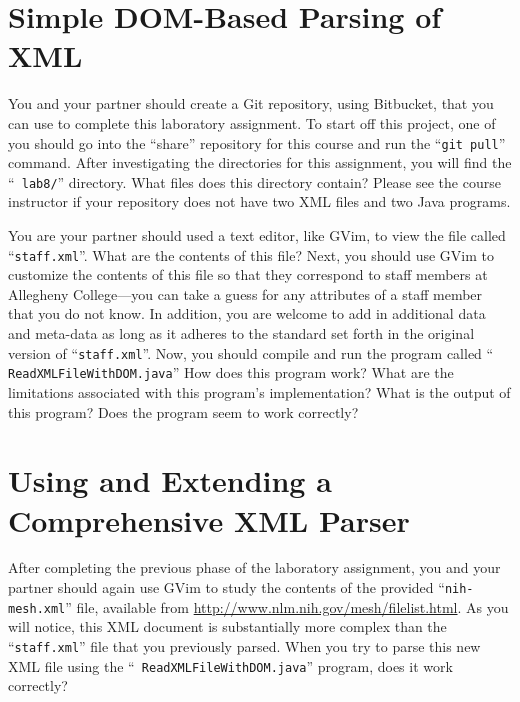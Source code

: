 \section*{Simple DOM-Based Parsing of XML}

You and your partner should create a Git repository, using Bitbucket, that you can use to complete this laboratory
assignment.  To start off this project, one of you should go into the ``share'' repository for this course and run the
``{\tt git pull}'' command. After investigating the directories for this assignment, you will find the ``{\tt
  lab8/}'' directory. What files does this directory contain?  Please see the course instructor if your repository does
not have two XML files and two Java programs.

You are your partner should used a text editor, like GVim, to view the file called ``{\tt staff.xml}''.  What are the
contents of this file?  Next, you should use GVim to customize the contents of this file so that they correspond to
staff members at Allegheny College---you can take a guess for any attributes of a staff member that you do not know.  In
addition, you are welcome to add in additional data and meta-data as long as it adheres to the standard set forth in the
original version of ``{\tt staff.xml}''. Now, you should compile and run the program called ``{\tt
  ReadXMLFileWithDOM.java}'' How does this program work? What are the limitations associated with this program's
implementation? What is the output of this program? Does the program seem to work correctly?

\vspace*{-.05in}
\section*{Using and Extending a Comprehensive XML Parser}

After completing the previous phase of the laboratory assignment, you and your partner should again use GVim to study
the contents of the provided ``{\tt nih-mesh.xml}'' file, available from
\url{http://www.nlm.nih.gov/mesh/filelist.html}. As you will notice, this XML document is substantially more complex
than the ``{\tt staff.xml}'' file that you previously parsed.  When you try to parse this new XML file using the ``{\tt
  ReadXMLFileWithDOM.java}'' program, does it work correctly?

